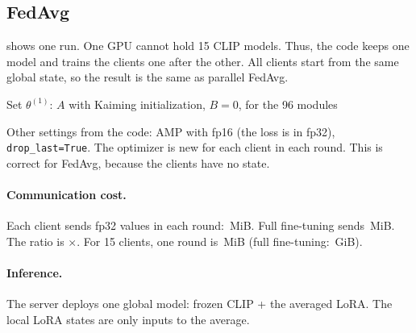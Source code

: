 \subsection{FedAvg}
 shows one run. One GPU cannot hold 15 CLIP models. Thus, the code keeps one model and trains the clients one after the other. All clients start from the same global state, so the result is the same as parallel FedAvg.

\begin{algorithm}[t]
\caption{FedAvg with LoRA ($E=1$ local epoch, batch size 64)}\label{alg:fedavg}
Set $\theta^{(1)}$: $A$ with Kaiming initialization, $B=0$, for the 96 modules\;
\end{algorithm}

Other settings from the code: AMP with fp16 (the loss is in fp32), \texttt{drop\_last=True}. The optimizer is new for each client in each round. This is correct for FedAvg, because the clients have no state.

\paragraph{Communication cost.} Each client sends \numTrainable{} fp32 values in each round: \numUplinkLoRA\,MiB. Full fine-tuning sends \numUplinkFull\,MiB. The ratio is \numUplinkRatio$\times$. For 15 clients, one round is \numUplinkRoundLoRA\,MiB (full fine-tuning: \numUplinkRoundFull\,GiB).

\paragraph{Inference.} The server deploys one global model: frozen CLIP + the averaged LoRA. The local LoRA states are only inputs to the average.


